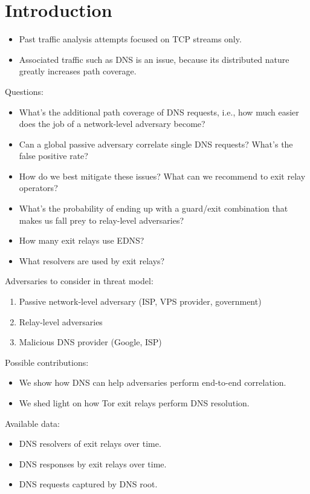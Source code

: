 \section{Introduction}
\label{sec:introduction}

\begin{itemize}
	\item Past traffic analysis attempts focused on TCP streams only.
	\item Associated traffic such as DNS is an issue, because its distributed
		nature greatly increases path coverage.
\end{itemize}

Questions:
\begin{itemize}
	\item What's the additional path coverage of DNS requests, i.e., how much
		easier does the job of a network-level adversary become?
	\item Can a global passive adversary correlate single DNS requests?  What's
		the false positive rate?
	\item How do we best mitigate these issues?  What can we recommend to exit
		relay operators?
	\item What's the probability of ending up with a guard/exit combination that
		makes us fall prey to relay-level adversaries?
	\item How many exit relays use EDNS?
	\item What resolvers are used by exit relays?
\end{itemize}

Adversaries to consider in threat model:
\begin{enumerate}
	\item Passive network-level adversary (ISP, VPS provider, government)
	\item Relay-level adversaries
	\item Malicious DNS provider (Google, ISP)
\end{enumerate}

Possible contributions:
\begin{itemize}
	\item We show how DNS can help adversaries perform end-to-end correlation.
	\item We shed light on how Tor exit relays perform DNS resolution.
\end{itemize}

Available data:
\begin{itemize}
	\item DNS resolvers of exit relays over time.
	\item DNS responses by exit relays over time.
	\item DNS requests captured by DNS root.
\end{itemize}

